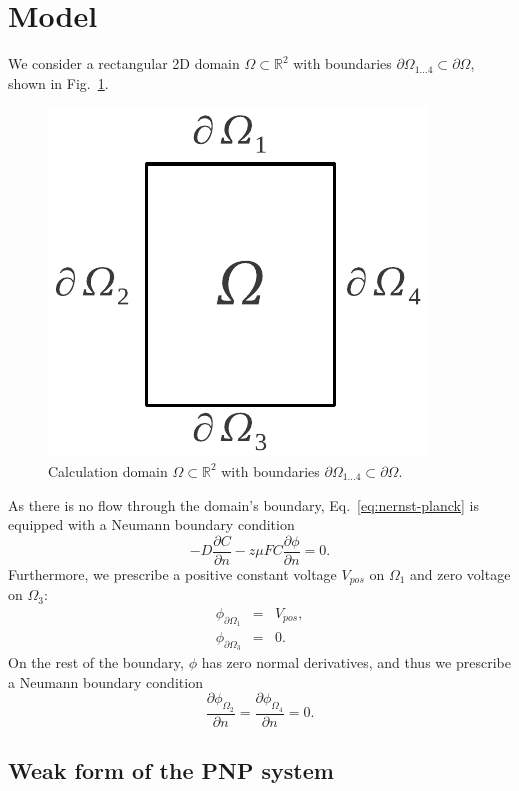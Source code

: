 \section{Model}\label{sec:model}

We consider a rectangular 2D domain $\Omega\subset\mathbb{R}^2$ with boundaries 
$\partial\Omega_{1\ldots 4}\subset\partial\Omega$, shown in Fig.~\ref{fig:domain}.

\begin{figure}[!ht]
  \begin{centering}
  \includegraphics[width=0.2\columnwidth]{domain}
  \caption{\label{fig:domain} Calculation domain $\Omega\subset\mathbb{R}^2$
  	with boundaries $\partial\Omega_{1\ldots 4}\subset\partial\Omega$.}
  \end{centering}
\end{figure}

As there is no flow through the domain's boundary, Eq.~\eqref{eq:nernst-planck}
is equipped with a Neumann boundary condition 
\begin{equation}
  -D \frac{\partial C}{\partial n} - z \mu F C \frac{\partial \phi} {\partial n} = 0.
  \label{eq:nernst-planck-boundary}
\end{equation}
Furthermore, we prescribe a positive constant voltage $V_{pos}$ 
on $\Omega_1$ and zero voltage on $\Omega_3$:
\begin{eqnarray}
  \phi_{\partial\Omega_1}&=&V_{pos},\\
  \phi_{\partial\Omega_3}&=&0.
  \label{eq:dirichlet}
\end{eqnarray}
On the rest of the boundary, $\phi$ has zero normal derivatives, and thus we prescribe 
a Neumann boundary condition
\begin{equation}
  \frac{\partial \phi_{\Omega_2}}{\partial n}=\frac{\partial \phi_{\Omega_4}}{\partial n}=0.
\end{equation}


\subsection{Weak form of the PNP system}


